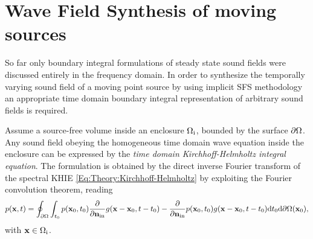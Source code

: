 \section{Wave Field Synthesis of moving sources}
\label{Sec:Moving_source_WFS}

So far only boundary integral formulations of steady state sound fields were discussed entirely in the frequency domain.
In order to synthesize the temporally varying sound field of a moving point source by using implicit SFS methodology an appropriate time domain boundary integral representation of arbitrary sound fields is required.

Assume a source-free volume inside an enclosure $\Omega_{\mathrm{i}}$, bounded by the surface $\partial \Omega$.
Any sound field obeying the homogeneous time domain wave equation inside the enclosure can be expressed by the \emph{time domain Kirchhoff-Helmholtz integral equation}.
The formulation is obtained by the direct inverse Fourier transform of the spectral KHIE \eqref{Eq:Theory:Kirchhoff-Helmholtz} by exploiting the Fourier convolution theorem, reading
\begin{equation}
\small
p(\mathbf{x},t) = \oint_{\partial \Omega} \int_{t_0} p(\mathbf{x}_0,t_0) \frac{\partial}{\partial \mathbf{n}_{\mathrm{in}}} g(\mathbf{x} - \mathbf{x}_0, t - t_0) - \frac{\partial}{\partial \mathbf{n}_{\mathrm{in}}}  p(\mathbf{x}_0,t_0) g(\mathbf{x} - \mathbf{x}_0, t - t_0) \mathrm{d} t_0 \mathrm{d} \partial \Omega(\mathbf{x}_0),
\end{equation}
with $\mathbf{x} \in \Omega_{\mathrm{i}}$.	

